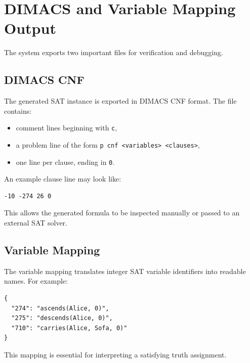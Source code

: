 \section{DIMACS and Variable Mapping Output} \label{sec:dimacs-and-variable-mapping-output}
The system exports two important files for verification and debugging.

\subsection{DIMACS CNF} \label{subsec:dimacs-cnf}

The generated SAT instance is exported in DIMACS CNF format.
The file contains:

\begin{itemize}
    \item comment lines beginning with \texttt{c},
    \item a problem line of the form \texttt{p cnf <variables> <clauses>},
    \item one line per clause, ending in \texttt{0}.
\end{itemize}

\noindent An example clause line may look like:
\begin{lstlisting}[label={lst:clause-example}]
-10 -274 26 0
\end{lstlisting}

\noindent This allows the generated formula to be inspected manually or passed to an external SAT solver.

\subsection{Variable Mapping} \label{subsec:variable-mapping}

The variable mapping translates integer SAT variable identifiers into readable names.
For example:
\begin{lstlisting}[label={lst:mapping-example}]
{
  "274": "ascends(Alice, 0)",
  "275": "descends(Alice, 0)",
  "710": "carries(Alice, Sofa, 0)"
}
\end{lstlisting}

\noindent This mapping is essential for interpreting a satisfying truth assignment.